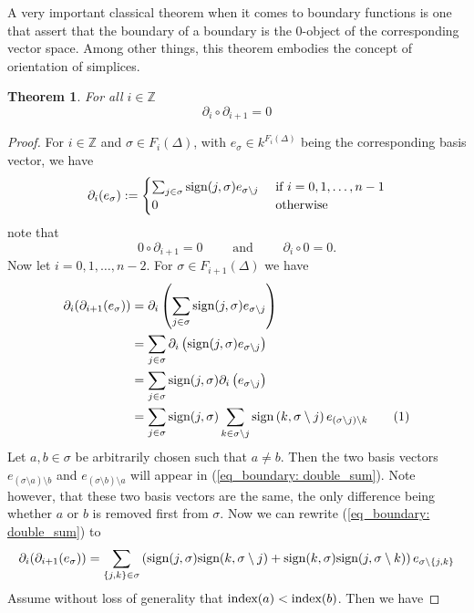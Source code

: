 \documentclass[11pt,a4paper,twoside]{report}
\newtheorem{mythm}{Theorem}[chapter]
\newcommand\numberthis{\addtocounter{equation}{1}\tag{\theequation}}
\begin{document}
A very important classical theorem when it comes to boundary functions is one that assert that the boundary of a boundary is the 0-object of the corresponding vector space. Among other things, this theorem embodies the concept of orientation of simplices.
\begin{mythm}\label{thm:boundary}
For all $i\in\mathbb{Z}$ 
\begin{equation*}
\partial_i\circ\partial_{i+1}=0
\end{equation*}
\end{mythm}
\begin{proof}
For $i\in\mathbb{Z}$ and $\sigma\in F_i(\Delta)$, with $e_\sigma\in k^{F_i(\Delta)}$ being the corresponding basis vector, we have 
\begin{equation*}
\partial_i(e_\sigma):=
\begin{cases}
\sum_{j\in\sigma}\textnormal{sign}(j,\sigma)e_{\sigma\setminus j} & \textnormal{ if } i=0,1,\dots,n-1 \\
0 & \textnormal{ otherwise}
\end{cases}
\end{equation*}
note that 
\begin{equation*}
0\circ\partial_{i+1}=0 \qquad \text{ and } \qquad \partial_i\circ 0 = 0.
\end{equation*}
Now let $i=0,1,\dots,n-2$. For $\sigma\in F_{i+1}(\Delta)$ we have
\begin{align*}
\partial_i(\partial_{i+1}(e_\sigma))&=\partial_i\left(\sum_{j\in\sigma}\textnormal{sign}(j,\sigma)e_{\sigma\setminus j}\right) \\
&=\sum_{j\in\sigma}\partial_i\left(\textnormal{sign}(j,\sigma)e_{\sigma\setminus j}\right)\\
&=\sum_{j\in\sigma}\textnormal{sign}(j,\sigma)\partial_i\left(e_{\sigma\setminus j}\right)\\
&=\sum_{j\in\sigma}\textnormal{sign}(j,\sigma)\sum_{k\in\sigma\setminus j}\textnormal{sign}\left(k,\sigma\setminus j\right)e_{(\sigma\setminus j)\setminus k}\numberthis \label{eq_boundary: double_sum}\\
\end{align*}
Let $a,b\in\sigma$ be arbitrarily chosen such that $a\not=b$. Then the two basis vectors $e_{(\sigma\setminus a)\setminus b}$ and $e_{(\sigma\setminus b)\setminus a}$ will appear in (\ref{eq_boundary: double_sum}). Note however, that these two basis vectors are the same, the only difference being whether $a$ or $b$ is removed first from $\sigma$. Now we can rewrite (\ref{eq_boundary: double_sum}) to
\begin{equation}
\partial_i(\partial_{i+1}(e_\sigma))=\sum_{\{j,k\}\in\sigma}\left(\textnormal{sign}(j,\sigma)\textnormal{sign}(k,\sigma\setminus j) + \textnormal{sign}(k,\sigma)\textnormal{sign}(j,\sigma\setminus k)\right)e_{\sigma\setminus\{j,k\}} \label{eq_boundary: 0}
\end{equation}
Assume without loss of generality that $\textnormal{index}(a)<\textnormal{index}(b)$. Then we have 


\end{proof}
\end{document}
